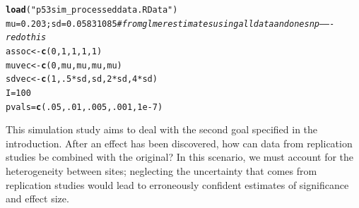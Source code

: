 \documentclass[AMA,STIX1COL]{WileyNJD-v2}\usepackage[]{graphicx}\usepackage[]{color}
\makeatletter
\newcommand{\hlnum}[1]{\textcolor[rgb]{0.686,0.059,0.569}{#1}}%
\newcommand{\hlstr}[1]{\textcolor[rgb]{0.192,0.494,0.8}{#1}}%
\newcommand{\hlcom}[1]{\textcolor[rgb]{0.678,0.584,0.686}{\textit{#1}}}%
\newcommand{\hlopt}[1]{\textcolor[rgb]{0,0,0}{#1}}%
\newcommand{\hlstd}[1]{\textcolor[rgb]{0.345,0.345,0.345}{#1}}%
\newcommand{\hlkwb}[1]{\textcolor[rgb]{0.69,0.353,0.396}{#1}}%
\newcommand{\hlkwd}[1]{\textcolor[rgb]{0.737,0.353,0.396}{\textbf{#1}}}%
\newenvironment{kframe}{%
 \def\at@end@of@kframe{}%
 \ifinner\ifhmode%
  \def\at@end@of@kframe{\end{minipage}}%
  \begin{minipage}{\columnwidth}%
 \fi\fi%
 \def\FrameCommand##1{\hskip\@totalleftmargin \hskip-\fboxsep
 \colorbox{shadecolor}{##1}\hskip-\fboxsep
     \hskip-\linewidth \hskip-\@totalleftmargin \hskip\columnwidth}%
 \MakeFramed {\advance\hsize-\width
   \@totalleftmargin\z@ \linewidth\hsize
   \@setminipage}}%
 {\par\unskip\endMakeFramed%
 \at@end@of@kframe}
\newenvironment{knitrout}{}{} %
\makeatother
\begin{document}
\begin{knitrout}
\color{fgcolor}\begin{kframe}
\begin{alltt}
\hlkwd{load}\hlstd{(}\hlstr{"p53sim_processeddata.RData"}\hlstd{)}
\hlstd{mu}\hlkwb{=}\hlnum{0.203}\hlstd{;sd}\hlkwb{=} \hlnum{0.05831085} \hlcom{#from glmer estimates using all data and one snp-------redo this}
\hlstd{assoc}\hlkwb{<-}\hlkwd{c}\hlstd{(}\hlnum{0}\hlstd{,}\hlnum{1}\hlstd{,}\hlnum{1}\hlstd{,}\hlnum{1}\hlstd{,}\hlnum{1}\hlstd{)}
\hlstd{muvec}\hlkwb{<-}\hlkwd{c}\hlstd{(}\hlnum{0}\hlstd{,mu,mu,mu,mu)}
\hlstd{sdvec}\hlkwb{<-}\hlkwd{c}\hlstd{(}\hlnum{1}\hlstd{,}\hlnum{.5}\hlopt{*}\hlstd{sd,sd,}\hlnum{2}\hlopt{*}\hlstd{sd,}\hlnum{4}\hlopt{*}\hlstd{sd)}
\hlstd{I} \hlkwb{=} \hlnum{100}
\hlstd{pvals}\hlkwb{=}\hlkwd{c}\hlstd{(}\hlnum{.05}\hlstd{,}\hlnum{.01}\hlstd{,}\hlnum{.005}\hlstd{,}\hlnum{.001}\hlstd{,} \hlnum{1e-7}\hlstd{)}
\end{alltt}
\end{kframe}
\end{knitrout}



This simulation study aims to deal with the second goal specified in the introduction. After an effect has been discovered, how can data from replication studies be combined with the original? In this scenario, we must account for the heterogeneity between sites; neglecting the uncertainty that comes from replication studies would lead to erroneously confident estimates of significance and effect size.
\end{document}

